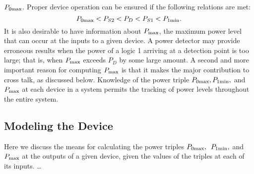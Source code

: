 $ P_{0\rm max}$.  Proper device operation can be ensured if the following
relations are met: 
\begin{equation} P_{0\rm max} < P_{S2} < P_{D} < P_{S1} < P_{1\rm
min}.\label{p0} 
\end{equation} 
It is also desirable to have information about $ P_{\rm max} $, the maximum
power level that can occur at the inputs to a given device.  A power
detector may provide erroneous results when the power of a logic 1 arriving
at a detection point is too large; that is, when $ P_{\rm max} $ exceeds $
P_D $ by some large amount.  A second and more important reason for
computing $ P_{\rm max} $ is that it makes the major contribution to cross
talk, as discussed below.  Knowledge of the power triple $ P_{0\rm max},
P_{1\rm min}, $ and $ P_{\rm max} $ at each device in a system permits the
tracking of power levels throughout the entire system.


\subsection{ Modeling the Device}
Here we discuss the means for calculating the power triples $ P_{0\rm
max},\kern.5em P_{1\rm min}, $ and $ P_{\rm max}$ at the outputs of a given
device, given the values of the triples at each of its inputs. \ldots

